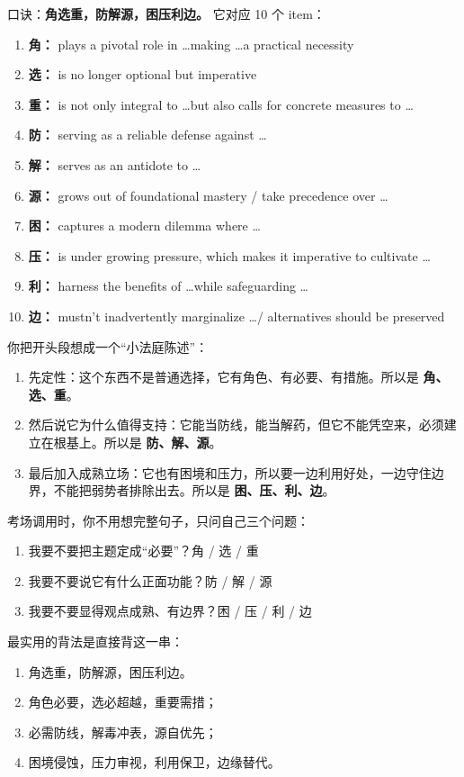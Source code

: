 ﻿\documentclass[lang=cn,11pt]{elegantbook}
\begin{document}
\begin{note}
口诀：\textbf{角选重，防解源，困压利边。}
它对应 10 个 item：
\begin{enumerate}
  \item \textbf{角：} plays a pivotal role in \ldots making \ldots a practical necessity
  \item \textbf{选：} is no longer optional but imperative
  \item \textbf{重：} is not only integral to \ldots but also calls for concrete measures to \ldots
  \item \textbf{防：} serving as a reliable defense against \ldots
  \item \textbf{解：} serves as an antidote to \ldots
  \item \textbf{源：} grows out of foundational mastery / take precedence over \ldots
  \item \textbf{困：} captures a modern dilemma where \ldots
  \item \textbf{压：} is under growing pressure, which makes it imperative to cultivate \ldots
  \item \textbf{利：} harness the benefits of \ldots while safeguarding \ldots
  \item \textbf{边：} mustn't inadvertently marginalize \ldots / alternatives should be preserved
\end{enumerate}
你把开头段想成一个“小法庭陈述”：
\begin{enumerate}
  \item 先定性：这个东西不是普通选择，它有角色、有必要、有措施。所以是 \textbf{角、选、重}。
  \item 然后说它为什么值得支持：它能当防线，能当解药，但它不能凭空来，必须建立在根基上。所以是 \textbf{防、解、源}。
  \item 最后加入成熟立场：它也有困境和压力，所以要一边利用好处，一边守住边界，不能把弱势者排除出去。所以是 \textbf{困、压、利、边}。
\end{enumerate}
考场调用时，你不用想完整句子，只问自己三个问题：
\begin{enumerate}
  \item 我要不要把主题定成“必要”？\quad 角 / 选 / 重
  \item 我要不要说它有什么正面功能？\quad 防 / 解 / 源
  \item 我要不要显得观点成熟、有边界？\quad 困 / 压 / 利 / 边
\end{enumerate}
最实用的背法是直接背这一串：
\begin{enumerate}
  \item 角选重，防解源，困压利边。
  \item 角色必要，选必超越，重要需措；
  \item 必需防线，解毒冲表，源自优先；
  \item 困境侵蚀，压力审视，利用保卫，边缘替代。
\end{enumerate}
\end{note}
\end{document}
